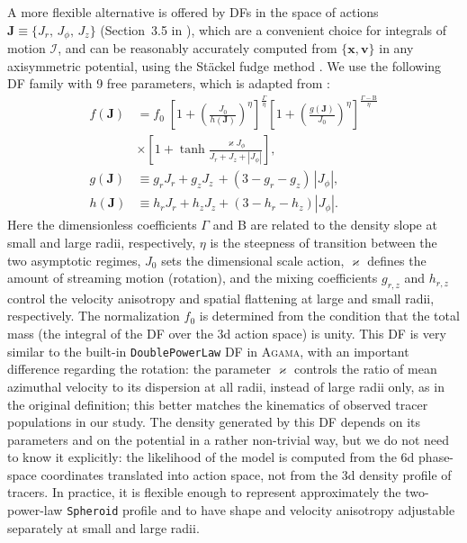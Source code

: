 \documentclass[usenatbib,fleqn]{mnras}
\begin{document}
A more flexible alternative is offered by DFs in the space of actions $\boldsymbol{J} \equiv \{J_r,\, J_\phi,\, J_z\}$ (Section~3.5 in \citealt{Binney2008}), which are a convenient choice for integrals of motion $\mathcal I$, and can be reasonably accurately computed from $\{\boldsymbol x, \boldsymbol v\}$ in any axisymmetric potential, using the St\"ackel fudge method \citep{Binney2012}. We use the following DF family with 9 free parameters, which is adapted from \citet{Posti2015}:
\begin{equation}  \label{eq:DPL_DF}
\begin{aligned}
f(\boldsymbol{J}) &= f_0\;
\left[ 1 + \left(\frac{J_0}{h(\boldsymbol{J})}\right)^\eta \right]^{\frac{\Gamma}{\eta}}
\left[ 1 + \left(\frac{g(\boldsymbol{J})}{J_0}\right)^\eta \right]^{\frac{\Gamma-\mathrm{B}}{\eta}} \\
 &\times \left[1 + \tanh\frac{\varkappa J_\phi}{J_r+J_z+|J_\phi|}\right] , \\
g(\boldsymbol{J}) &\equiv g_r J_r + g_z J_z\, + (3-g_r-g_z)\, |J_\phi|, \\
h(\boldsymbol{J}) &\equiv h_r J_r + h_z J_z   + (3-h_r-h_z)   |J_\phi|.
\end{aligned}   
\end{equation}
Here the dimensionless coefficients $\Gamma$ and B are related to the density slope at small and large radii, respectively, $\eta$ is the steepness of transition between the two asymptotic regimes,  $J_0$ sets the dimensional scale action, $\varkappa$ defines the amount of streaming motion (rotation), and the mixing coefficients $g_{r,z}$ and $h_{r,z}$ control the velocity anisotropy and spatial flattening at large and small radii, respectively. The normalization $f_0$ is determined from the condition that the total mass (the integral of the DF over the 3d action space) is unity. This DF is very similar to the built-in \texttt{DoublePowerLaw} DF in \textsc{Agama}, with an important difference regarding the rotation: the parameter $\varkappa$ controls the ratio of mean azimuthal velocity to its dispersion at all radii, instead of large radii only, as in the original definition; this better matches the kinematics of observed tracer populations in our study. The density generated by this DF depends on its parameters and on the potential in a rather non-trivial way, but we do not need to know it explicitly: the likelihood of the model is computed from the 6d phase-space coordinates translated into action space, not from the 3d density profile of tracers. In practice, it is flexible enough to represent approximately the two-power-law \texttt{Spheroid} profile and to have shape and velocity anisotropy adjustable separately at small and large radii.
\end{document}
